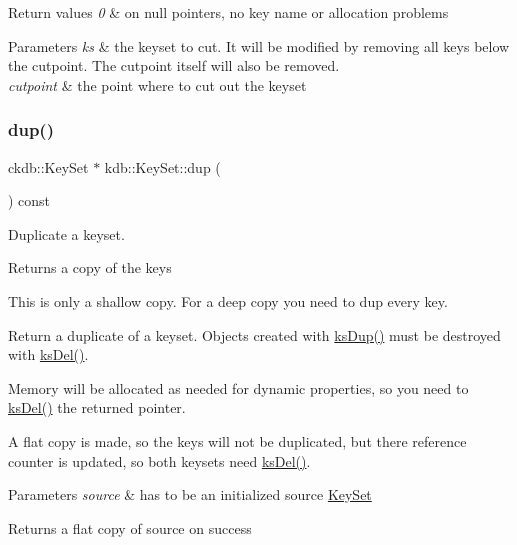 \begin{DoxyRetVals}{Return values}
{\em 0} & on null pointers, no key name or allocation problems \\
\hline
\end{DoxyRetVals}

\begin{DoxyParams}{Parameters}
{\em ks} & the keyset to cut. It will be modified by removing all keys below the cutpoint. The cutpoint itself will also be removed. \\
\hline
{\em cutpoint} & the point where to cut out the keyset \\
\hline
\end{DoxyParams}
\mbox{\label{classkdb_1_1KeySet_ad3f2b936d66729690e8a8a45b5074baa}} 
\subsubsection{\texorpdfstring{dup()}{dup()}}
{\footnotesize\ttfamily ckdb\+::\+Key\+Set $\ast$ kdb\+::\+Key\+Set\+::dup (\begin{DoxyParamCaption}{ }\end{DoxyParamCaption}) const\hspace{0.3cm}{\ttfamily [inline]}}



Duplicate a keyset. 

\begin{DoxyReturn}{Returns}
a copy of the keys
\end{DoxyReturn}
This is only a shallow copy. For a deep copy you need to dup every key.

Return a duplicate of a keyset. Objects created with \hyperlink{group__keyset_gac59e4b328245463f1451f68d5106151c}{ks\+Dup()} must be destroyed with \hyperlink{group__keyset_ga27e5c16473b02a422238c8d970db7ac8}{ks\+Del()}.

Memory will be allocated as needed for dynamic properties, so you need to \hyperlink{group__keyset_ga27e5c16473b02a422238c8d970db7ac8}{ks\+Del()} the returned pointer.

A flat copy is made, so the keys will not be duplicated, but there reference counter is updated, so both keysets need \hyperlink{group__keyset_ga27e5c16473b02a422238c8d970db7ac8}{ks\+Del()}.


\begin{DoxyParams}{Parameters}
{\em source} & has to be an initialized source \hyperlink{classkdb_1_1KeySet}{Key\+Set} \\
\hline
\end{DoxyParams}
\begin{DoxyReturn}{Returns}
a flat copy of source on success 
\end{DoxyReturn}

